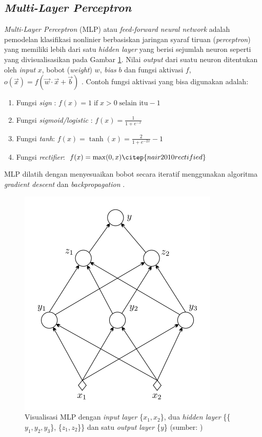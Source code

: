 \subsection{\textit{Multi-Layer Perceptron}}

\textit{Multi-Layer Perceptron} (MLP) atau \textit{feed-forward neural network} adalah pemodelan klasifikasi nonlinier berbasiskan jaringan syaraf tiruan (\textit{perceptron}) yang memiliki lebih dari satu \textit{hidden layer} yang berisi sejumlah neuron \citep{theodoridis2015machine} seperti yang divisualisasikan pada Gambar \ref{fig:mlp}. Nilai \textit{output} dari suatu neuron ditentukan oleh \textit{input} $x$, bobot (\textit{weight}) $w$, \textit{bias} $b$ dan fungsi aktivasi $f$, $o(\vec{x}) = f(\vec{w} \cdot \vec{x} + \vec{b})$ \citep{mitchell1997machine}. Contoh fungsi aktivasi yang bisa digunakan \citep{mitchell1997machine} adalah:

\begin{enumerate}
	\item Fungsi \textit{sign} : $ f(x) = 1 \; \textrm{if} \; x > 0 \; \textrm{selain itu} -1 $
	\item Fungsi \textit{sigmoid/logistic} : $ f(x)={\frac {1}{1+e^{-x}}} $
	\item Fungsi \textit{tanh}: $ f(x)=\tanh(x)={\frac {2}{1+e^{-2x}}}-1 $
	\item Fungsi \textit{rectifier}: $ f(x)=\max(0,x) \citep{nair2010rectified} $
\end{enumerate}

MLP dilatih dengan menyesuaikan bobot secara iteratif menggunakan algoritma \textit{gradient descent} dan \textit{backpropagation} \citep{theodoridis2015machine}.

\begin{figure}
\centering
\includegraphics[scale=0.5]{../images/mlp.png}
\caption{Visualisasi MLP dengan \textit{input layer} \{$x_1, x_2$\}, dua \textit{hidden layer} \{\{$y_1, y_2, y_3$\}, \{$z_1, z_2$\}\} dan satu \textit{output layer} \{$y$\} (sumber: \cite{theodoridis2015machine})}
\label{fig:mlp}
\end{figure}


